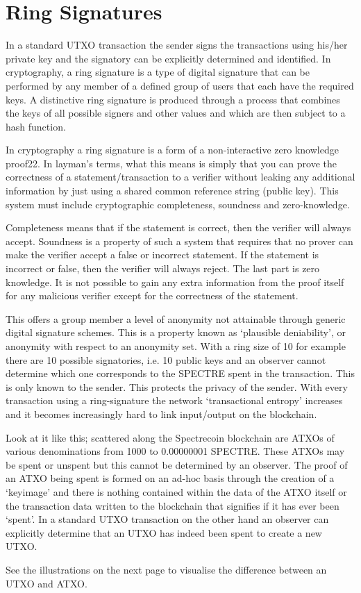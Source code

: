 \chapter{Ring Signatures}
In a standard UTXO transaction the sender signs the transactions using his/her private key and the signatory can be explicitly determined and identified. In cryptography, a ring signature is a type of digital signature that can be performed by any member of a defined group of users that each have the required keys. A distinctive ring signature is produced through a process that combines the keys of all possible signers and other values and which are then subject to a hash function. 

 

In cryptography a ring signature is a form of a non-interactive zero knowledge proof22. In layman’s terms, what this means is simply that you can prove the correctness of a statement/transaction to a verifier without leaking any additional information by just using a shared common reference string (public key). This system must include cryptographic completeness, soundness and zero-knowledge. 

 

Completeness means that if the statement is correct, then the verifier will always accept. Soundness is a property of such a system that requires that no prover can make the verifier accept a false or incorrect statement. If the statement is incorrect or false, then the verifier will always reject. The last part is zero knowledge. It is not possible to gain any extra information from the proof itself for any malicious verifier except for the correctness of the statement. 

 

This offers a group member a level of anonymity not attainable through generic digital signature schemes. This is a property known as ‘plausible deniability’, or anonymity with respect to an anonymity set. With a ring size of 10 for example there are 10 possible signatories, i.e. 10 public keys and an observer cannot determine which one corresponds to the SPECTRE spent in the transaction. This is only known to the sender. This protects the privacy of the sender. With every transaction using a ring-signature the network ‘transactional entropy’ increases and it becomes increasingly hard to link input/output on the blockchain. 

 

Look at it like this; scattered along the Spectrecoin blockchain are ATXOs of various denominations from 1000 to 0.00000001 SPECTRE. These ATXOs may be spent or unspent but this cannot be determined by an observer. The proof of an ATXO being spent is formed on an ad-hoc basis through the creation of a ‘keyimage’ and there is nothing contained within the data of the ATXO itself or the transaction data written to the blockchain that signifies if it has ever been ‘spent’. In a standard UTXO transaction on the other hand an observer can explicitly determine that an UTXO has indeed been spent to create a new UTXO. 

 

See the illustrations on the next page to visualise the difference between an UTXO and ATXO. 